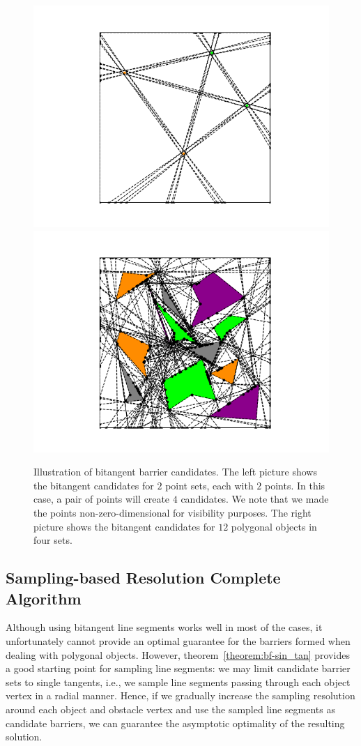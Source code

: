 \begin{figure}[ht]
    \centering
    \includegraphics[trim=80 20 80 20,clip, width = .24\textwidth]{chapters/bf/fig/candidate_1.png}
    \hspace{-.1in}
    \includegraphics[trim=80 20 80 20,clip, width = .24\textwidth]{chapters/bf/fig/candidate_2.png}
    \caption[Illustration of bitangent barrier candidates]{Illustration of bitangent barrier candidates. The left picture shows the bitangent
    candidates for $2$ point sets, each with $2$ points. In this case, a pair of points will create $4$ candidates. 
    We note that we made the points non-zero-dimensional for visibility purposes. 
    The right picture shows the bitangent candidates for $12$ polygonal objects in four sets.}
    \label{fig:bf-barrier_candidates}
\end{figure}

\subsection{Sampling-based Resolution Complete Algorithm}
Although using bitangent line segments works well in most of the cases, it unfortunately cannot provide an optimal guarantee for the barriers formed when dealing with polygonal objects.
However, theorem~\ref{theorem:bf-sin_tan} provides a good starting point for sampling line segments: we may limit candidate barrier sets to single tangents, 
i.e., we sample line segments passing through each object vertex in a radial manner. 
Hence, if we gradually increase the sampling resolution around each object and obstacle vertex and use the sampled line segments as candidate barriers, 
we can guarantee the asymptotic optimality of the resulting solution.


